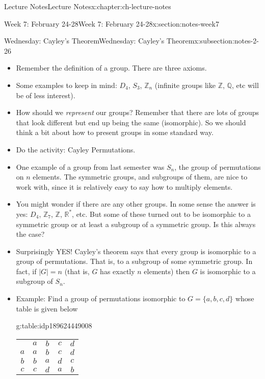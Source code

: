 \documentclass[oneside,11pt,]{book}
\newcommand{\tabularfont}{\relax}
\begin{document}
\begin{chapterptx}{Lecture Notes}{}{Lecture Notes}{}{}{x:chapter:ch-lecture-notes}
\begin{sectionptx}{Week 7: February 24-28}{}{Week 7: February 24-28}{}{}{x:section:notes-week7}
\begin{subsectionptx}{Wednesday: Cayley's Theorem}{}{Wednesday: Cayley's Theorem}{}{}{x:subsection:notes-2-26}
\begin{itemize}[label=\textbullet]
\item{}Remember the definition of a group. There are three axioms.%
\item{}Some examples to keep in mind: \(D_4\),            \(S_3\),            \(\mathbb Z_n\) (infinite groups like \(\mathbb Z\),            \(\mathbb Q\), etc will be of less interest).%
\item{}How should we \emph{represent} our groups? Remember that there are lots of groups that look different but end up being the same (isomorphic). So we should think a bit about how to present groups in some standard way.%
\item{}Do the activity: Cayley Permutations.%
\item{}One example of a group from last semester was \(S_n\), the group of permutations on \(n\) elements. The symmetric groups, and subgroups of them, are nice to work with, since it is relatively easy to say how to multiply elements.%
\item{}You might wonder if there are any other groups. In some sense the answer is yes: \(D_4\), \(\mathbb Z_7\), \(\mathbb Z\), \(\mathbb R^*\), etc. But some of these turned out to be isomorphic to a symmetric group or at least a subgroup of a symmetric group. Is this always the case?%
\item{}Surprisingly YES! Cayley’s theorem says that every group is isomorphic to a group of permutations. That is, to a subgroup of some symmetric group. In fact, if \(|G| = n\) (that is, \(G\) has exactly \(n\) elements) then \(G\) is isomorphic to a subgroup of \(S_n\).%
\item{}Example: Find a group of permutations isomorphic to \(G = \{a,b,c,d\}\) whose table is given below%
\begin{tableptx}{\textbf{}}{g:table:idp189624449008}{}%
\centering
{\tabularfont%
\begin{tabular}{lllll}
\multicolumn{1}{c}{}&\multicolumn{1}{c}{\(a\)}&\multicolumn{1}{c}{\(b\)}&\multicolumn{1}{c}{\(c\)}&\multicolumn{1}{c}{\(d\)}\tabularnewline[0pt]
\multicolumn{1}{c}{\(a\)}&\multicolumn{1}{c}{\(a\)}&\multicolumn{1}{c}{\(b\)}&\multicolumn{1}{c}{\(c\)}&\multicolumn{1}{c}{\(d\)}\tabularnewline[0pt]
\multicolumn{1}{c}{\(b\)}&\multicolumn{1}{c}{\(b\)}&\multicolumn{1}{c}{\(a\)}&\multicolumn{1}{c}{\(d\)}&\multicolumn{1}{c}{\(c\)}\tabularnewline[0pt]
\multicolumn{1}{c}{\(c\)}&\multicolumn{1}{c}{\(c\)}&\multicolumn{1}{c}{\(d\)}&\multicolumn{1}{c}{\(a\)}&\multicolumn{1}{c}{\(b\)}\tabularnewline[0pt]

\end{tabular}}
\end{tableptx}
\end{itemize}
\end{subsectionptx}
\end{sectionptx}
\end{chapterptx}
\end{document}
